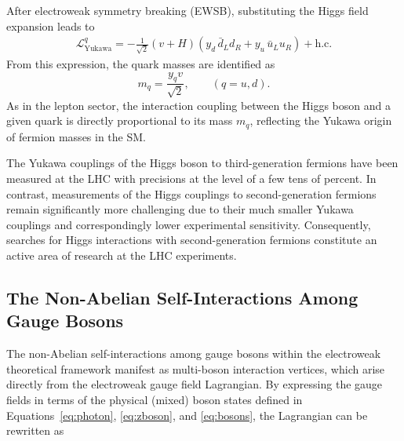 After electroweak symmetry breaking (EWSB), substituting the Higgs field expansion leads to
\begin{equation}\label{eq:lag_ew_yukawa}
\begin{aligned}
    \mathcal{L}_{\text{Yukawa}}^{q}
    =
    -\frac{1}{\sqrt{2}} (v + H)
    \left(
        y_d\, \bar{d}_L d_R
        +
        y_u\, \bar{u}_L u_R
    \right)
    + \text{h.c.}
\end{aligned}
\end{equation}
From this expression, the quark masses are identified as
\begin{equation}
    m_q = \frac{y_q v}{\sqrt{2}},
    \qquad (q = u, d).
\end{equation}
As in the lepton sector, the interaction coupling between the Higgs boson and a given quark is directly proportional to its mass $m_q$, reflecting the Yukawa origin of fermion masses in the SM.

The Yukawa couplings of the Higgs boson to third-generation fermions have been measured at the LHC with precisions at the level of a few tens of percent. In contrast, measurements of the Higgs couplings to second-generation fermions remain significantly more challenging due to their much smaller Yukawa couplings and correspondingly lower experimental sensitivity. Consequently, searches for Higgs interactions with second-generation fermions constitute an active area of research at the LHC experiments.

\subsection{The Non-Abelian Self-Interactions Among Gauge Bosons}
\label{boson-interactions}

The non-Abelian self-interactions among gauge bosons within the electroweak theoretical framework manifest as multi-boson interaction vertices, which arise directly from the electroweak gauge field Lagrangian. By expressing the gauge fields in terms of the physical (mixed) boson states defined in Equations~\eqref{eq:photon}, \eqref{eq:zboson}, and \eqref{eq:bosons}, the Lagrangian can be rewritten as\par

